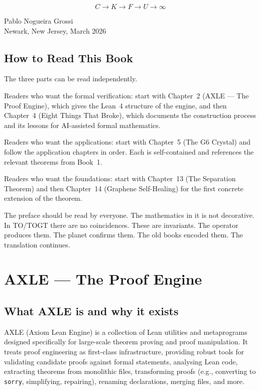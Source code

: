\[
C \to K \to F \to U \to \infty
\]

\begin{flushright}
Pablo Nogueira Grossi\\
Newark, New Jersey, March 2026
\end{flushright}

\section{How to Read This Book}

The three parts can be read independently.

Readers who want the formal verification: start with Chapter~2
(AXLE --- The Proof Engine), which gives the Lean~4 structure of
the engine, and then Chapter~4 (Eight Things That Broke), which
documents the construction process and its lessons for AI-assisted
formal mathematics.

Readers who want the applications: start with Chapter~5 (The G6
Crystal) and follow the application chapters in order. Each is
self-contained and references the relevant theorems from Book~1.

Readers who want the foundations: start with Chapter~13 (The
Separation Theorem) and then Chapter~14 (Graphene Self-Healing)
for the first concrete extension of the theorem.

The preface should be read by everyone. The mathematics in it is
not decorative. In TO/TOGT there are no coincidences. These are
invariants. The operator produces them. The planet confirms them.
The old books encoded them. The translation continues.

\chapter{AXLE --- The Proof Engine}

\section{What AXLE is and why it exists}

AXLE (Axiom Lean Engine) is a collection of Lean utilities and metaprograms designed specifically for large-scale theorem proving and proof manipulation. It treats proof engineering as first-class infrastructure, providing robust tools for validating candidate proofs against formal statements, analysing Lean code, extracting theorems from monolithic files, transforming proofs (e.g., converting to \texttt{sorry}, simplifying, repairing), renaming declarations, merging files, and more.

